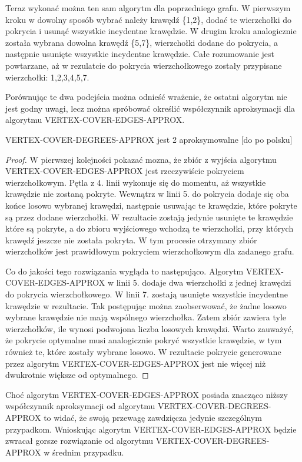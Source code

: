 

	Teraz wykonać można ten sam algorytm dla poprzedniego grafu. W pierwszym kroku w dowolny sposób wybrać należy krawędź \{1,2\}, dodać te wierzchołki do pokrycia i usunąć wszystkie incydentne krawędzie. W drugim kroku analogicznie została wybrana dowolna krawędź \{5,7\}, wierzchołki dodane do pokrycia, a następnie usunięte wszystkie incydentne krawędzie. Całe rozumowanie jest powtarzane, aż w rezulatcie do pokrycia wierzchołkowego zostały przypisane wierzchołki: 1,2,3,4,5,7.



Porównując te dwa podejścia można odnieść wrażenie, że ostatni algorytm nie jest godny uwagi, lecz można spróbować określić współczynnik aproksymacji dla algorytmu VERTEX-COVER-EDGES-APPROX.

\begin{twr}
VERTEX-COVER-DEGREES-APPROX jest 2 aproksymowalne [do po polsku]
\end{twr}

\begin{proof}
W pierwszej kolejności pokazać mozna, że zbiór z wyjścia algorytmu VERTEX-COVER-EDGES-APPROX jest rzeczywiście pokryciem wierzchołkowym. Pętla z 4. linii wykonuje się do momentu, aż wszystkie krawędzie nie zostaną pokryte. Wewnątrz w linii 5. do pokrycia dodaje się oba końce losowo wybranej krawędzi, następnie usuwając te krawędzie, które pokryte są przez dodane wierzchołki. W rezultacie zostają jedynie usunięte te krawędzie które są pokryte, a do zbioru wyjściowego wchodzą te wierzchołki, przy których krawędź jeszcze nie została pokryta. W tym procesie otrzymany zbiór wierzchołków jest prawidłowym pokryciem wierzchołkowym dla zadanego grafu.

Co do jakości tego rozwiązania wygląda to następująco. Algorytm VERTEX-COVER-EDGES-APPROX w linii 5. dodaje dwa wierzchołki z jednej krawędzi do pokrycia wierzchołkowego. W linii 7. zostają usunięte wszystkie incydentne krawędzie w rezultacie. Tak postępując można zaobserwować, że żadne losowo wybrane krawędzie nie mają wspólnego wierzchołka. Zatem zbiór zawiera tyle wierzchołków, ile wynosi podwojona liczba losowych krawędzi. Warto zauważyć, że pokrycie optymalne musi analogicznie pokryć wszystkie krawędzie, w tym również te, które zostały wybrane losowo. W rezultacie pokrycie generowane przez algorytm VERTEX-COVER-EDGES-APPROX jest nie więcej niż dwukrotnie większe od optymalnego.
\end{proof}

Choć algorytm VERTEX-COVER-EDGES-APPROX posiada znacząco niższy współczynnik aproksymacji od algorytmu VERTEX-COVER-DEGREES-APPROX to widać, że swoją przewagę zawdzięcza jedynie szczególnym przypadkom. Wnioskując algorytm VERTEX-COVER-EDGES-APPROX będzie zwracał gorsze rozwiązanie od algorytmu VERTEX-COVER-DEGREES-APPROX w średnim przypadku.